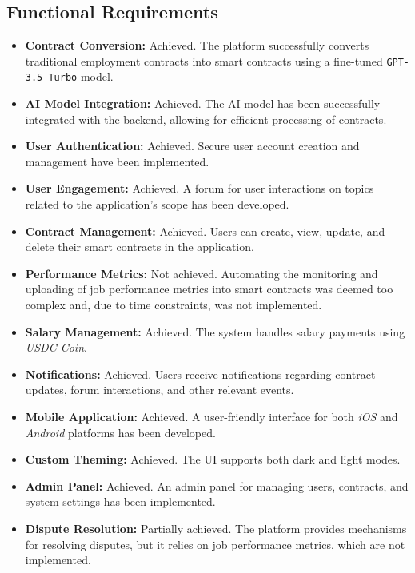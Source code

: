 \subsection{Functional Requirements}

\begin{itemize}
    \item \textbf{Contract Conversion:} Achieved. The platform successfully converts traditional employment contracts into smart contracts using a fine-tuned \texttt{GPT-3.5 Turbo} model.
    \item \textbf{AI Model Integration:} Achieved. The AI model has been successfully integrated with the backend, allowing for efficient processing of contracts.
    \item \textbf{User Authentication:} Achieved. Secure user account creation and management have been implemented.
    \item \textbf{User Engagement:} Achieved. A forum for user interactions on topics related to the application's scope has been developed.
    \item \textbf{Contract Management:} Achieved. Users can create, view, update, and delete their smart contracts in the application.
    \item \textbf{Performance Metrics:} Not achieved. Automating the monitoring and uploading of job performance metrics into smart contracts was deemed too complex and, due to time constraints, was not implemented. %
    \item \textbf{Salary Management:} Achieved. The system handles salary payments using \textit{USDC Coin}.
    \item \textbf{Notifications:} Achieved. Users receive notifications regarding contract updates, forum interactions, and other relevant events.
    \item \textbf{Mobile Application:} Achieved. A user-friendly interface for both \textit{iOS} and \textit{Android} platforms has been developed.
    \item \textbf{Custom Theming:} Achieved. The UI supports both dark and light modes.
    \item \textbf{Admin Panel:} Achieved. An admin panel for managing users, contracts, and system settings has been implemented.
    \item \textbf{Dispute Resolution:} Partially achieved. The platform provides mechanisms for resolving disputes, but it relies on job performance metrics, which are not implemented.
\end{itemize}

